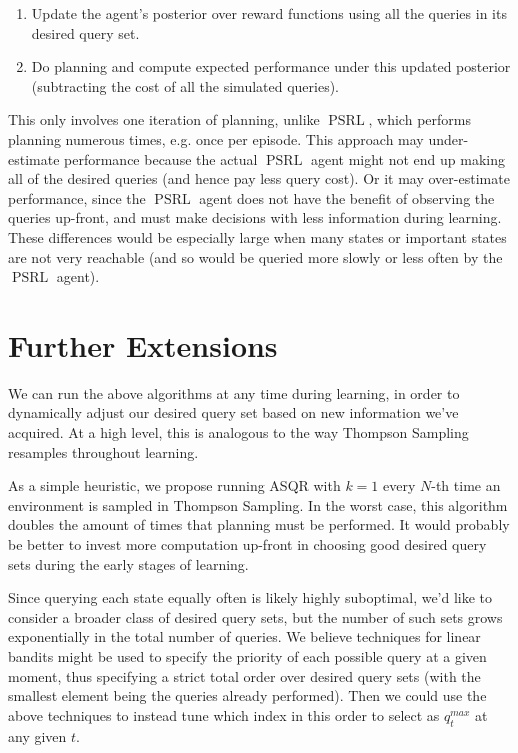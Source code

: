 \documentclass{article}
\begin{document}
\begin{enumerate}
\item Update the agent's posterior over reward functions using all the queries in its desired query set.%
\item Do planning and compute expected performance under this updated posterior (subtracting the cost of all the simulated queries).
\end{enumerate}

This only involves one iteration of planning, unlike $\mathop{PSRL}$, which performs planning numerous times, e.g. once per episode.
This approach may under-estimate performance because the actual $\mathop{PSRL}$ agent might not end up making all of the desired queries (and hence pay less query cost).
Or it may over-estimate performance, since the $\mathop{PSRL}$ agent does not have the benefit of observing the queries up-front, and must make decisions with less information during learning.
These differences would be especially large when many states or important states are not very reachable (and so would be queried more slowly or less often by the $\mathop{PSRL}$ agent).

\section{Further Extensions}
We can run the above algorithms at any time during learning, in order to dynamically adjust our desired query set based on new information we've acquired.
At a high level, this is analogous to the way Thompson Sampling resamples throughout learning.

As a simple heuristic, we propose running ASQR with $k=1$ every $N$-th time an environment is sampled in Thompson Sampling.
In the worst case, this algorithm doubles the amount of times that planning must be performed.
It would probably be better to invest more computation up-front in choosing good desired query sets during the early stages of learning.


Since querying each state equally often is likely highly suboptimal, we'd like to consider a broader class of desired query sets, but the number of such sets grows exponentially in the total number of queries.
We believe techniques for linear bandits might be used to specify the priority of each possible query at a given moment, thus specifying a strict total order over desired query sets (with the smallest element being the queries already performed).
Then we could use the above techniques to instead tune which index in this order to select as $q^{max}_t$ at any given $t$.
\end{document}
